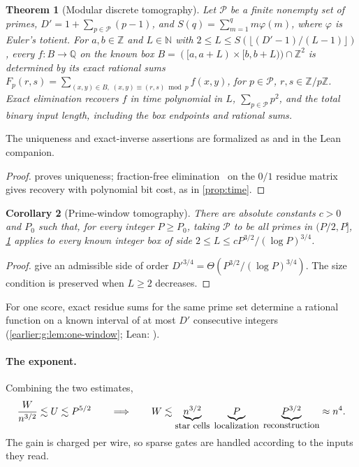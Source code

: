 \documentclass[11pt,letterpaper]{article}
\newtheorem{theorem}{Theorem}[section]
\newtheorem{corollary}[theorem]{Corollary}
\theoremstyle{definition}
\theoremstyle{remark}
\newcommand{\Q}{\mathbb Q}
\newcommand{\Z}{\mathbb Z}
\newcommand{\N}{\mathbb N}
\begin{document}
\par\noindent\begin{minipage}{\linewidth}
\begin{theorem}[Modular discrete tomography]\label{thm:modular-tomography}
Let \(\mathcal P\) be a finite nonempty set of primes, \(D'=1+\sum_{p\in\mathcal P}(p-1)\), and \(S(q)=\sum_{m=1}^{q}m\varphi(m)\), where \(\varphi\) is Euler's totient.
For \(a,b\in\Z\) and \(L\in\N\) with \(2\le L\le S(\lfloor(D'-1)/(L-1)\rfloor)\), every \(f:B\to\Q\) on the known box \(B=([a,a+L)\times[b,b+L))\cap\Z^2\) is determined by its exact rational sums
\(F_p(r,s)=\sum_{(x,y)\in B,\;(x,y)\equiv(r,s)\bmod p}f(x,y)\), for \(p\in\mathcal P\), \(r,s\in\Z/p\Z\).
Exact elimination recovers \(f\) in time polynomial in \(L\), \(\sum_{p\in\mathcal P}p^2\), and the total binary input length, including the box endpoints and rational sums.
\end{theorem}
\end{minipage}\par\smallskip
The uniqueness and exact-inverse assertions are formalized as
 and
 in the Lean companion.
\begin{proof}
 proves uniqueness; fraction-free elimination~\cite{Bareiss68} on the \(0/1\) residue matrix gives recovery with polynomial bit cost, as in \cref{prop:time}.
\end{proof}

\begin{corollary}[Prime-window tomography]\label{cor:prime-window-tomography}
There are absolute constants \(c>0\) and \(P_0\) such that, for every integer \(P\ge P_0\), taking \(\mathcal P\) to be all primes in \((P/2,P]\), \cref{thm:modular-tomography} applies to every known integer box of side \(2\le L\le cP^{3/2}/(\log P)^{3/4}\).
\end{corollary}
\begin{proof}
 give an admissible side of order \(D'^{3/4}=\Theta(P^{3/2}/(\log P)^{3/4})\). The size condition is preserved when \(L\ge2\) decreases.
\end{proof}
For one score, exact residue sums for the same prime set determine a rational function on a known interval of at most \(D'\) consecutive integers (\cref{earlier:g:lem:one-window}; Lean: ).

\paragraph{The exponent.}
Combining the two estimates,
\[
 \frac{W}{n^{3/2}}\lesssim U\lesssim P^{5/2}
 \qquad\Longrightarrow\qquad
 W\lesssim
 \underbrace{n^{3/2}}_{\text{\fontsize{9}{10.8}\selectfont star cells}}\;
 \underbrace{P}_{\text{\fontsize{9}{10.8}\selectfont localization}}\;
 \underbrace{P^{3/2}}_{\text{\fontsize{9}{10.8}\selectfont reconstruction}}
 \approx n^4 .
\]
The gain is charged per wire, so sparse gates are handled according
to the inputs they read.
\end{document}
